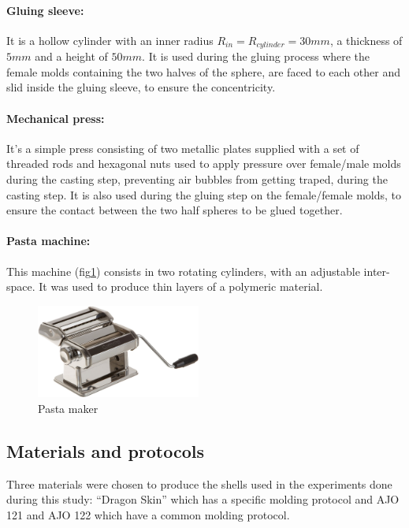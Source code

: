 \paragraph{Gluing sleeve:}
It is a hollow cylinder with an inner radius $R_{in} = R_{cylinder} = 30 mm$, a thickness of $5 mm$ and a height of $50 mm$. It is used during the gluing process where the female molds containing the two halves of the sphere, are faced to each other and slid inside the gluing sleeve, to ensure the concentricity.

\paragraph{Mechanical press:}
It's a simple press consisting of two metallic plates supplied with a set of threaded rods and hexagonal nuts used to apply pressure over female/male molds during the casting step, preventing air bubbles from getting traped, during the casting step. It is also used during the gluing step on the female/female molds, to ensure the contact between the two half spheres to be glued together.

\paragraph{Pasta machine:}
This machine (fig\ref{fig:pasta_maker}) consists in two rotating cylinders, with an adjustable inter-space. It was used to produce thin layers of a polymeric material.
\begin{figure}[H] %
	\centering%
  \includegraphics[width=0.48\textwidth]{figures/Chapter_1/rolling_machine.png}
	\caption{Pasta maker}
	\label{fig:pasta_maker}
\end{figure}

\newpage
\subsection{Materials and protocols}
Three materials were chosen to produce the shells used in the experiments done during this study: "`Dragon Skin"' which has a specific molding protocol and AJO 121 and AJO 122 which have a common molding protocol.

